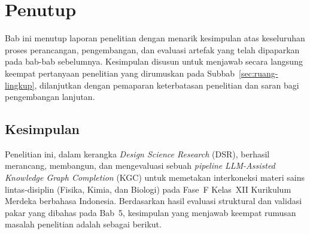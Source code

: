 \documentclass[main]{subfiles}
\begin{document}
\ifSubfilesClassLoaded{}{\setcounter{chapter}{5}}

\chapter{Penutup}\label{sec:penutup}

Bab ini menutup laporan penelitian dengan menarik kesimpulan atas keseluruhan
proses perancangan, pengembangan, dan evaluasi artefak yang telah dipaparkan
pada bab-bab sebelumnya. Kesimpulan disusun untuk menjawab secara langsung
keempat pertanyaan penelitian yang dirumuskan pada Subbab~\ref{sec:ruang-lingkup},
dilanjutkan dengan pemaparan keterbatasan penelitian dan saran bagi
pengembangan lanjutan.

\section{Kesimpulan}

Penelitian ini, dalam kerangka \textit{Design Science Research} (DSR), berhasil
merancang, membangun, dan mengevaluasi sebuah \textit{pipeline}
\textit{LLM-Assisted Knowledge Graph Completion} (KGC) untuk memetakan
interkoneksi materi sains lintas-disiplin (Fisika, Kimia, dan Biologi) pada
Fase~F Kelas~XII Kurikulum Merdeka berbahasa Indonesia. Berdasarkan hasil
evaluasi struktural dan validasi pakar yang dibahas pada Bab~5, kesimpulan yang
menjawab keempat rumusan masalah penelitian adalah sebagai berikut.
\end{document}
